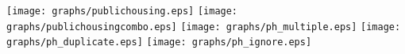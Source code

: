 \documentclass{article}
\begin{document}
\texttt{[image: graphs/publichousing.eps]} \pagebreak
\texttt{[image: graphs/publichousingcombo.eps]} \pagebreak
\texttt{[image: graphs/ph\_multiple.eps]} \pagebreak
\texttt{[image: graphs/ph\_duplicate.eps]} \pagebreak
\texttt{[image: graphs/ph\_ignore.eps]} \pagebreak
\end{document}
